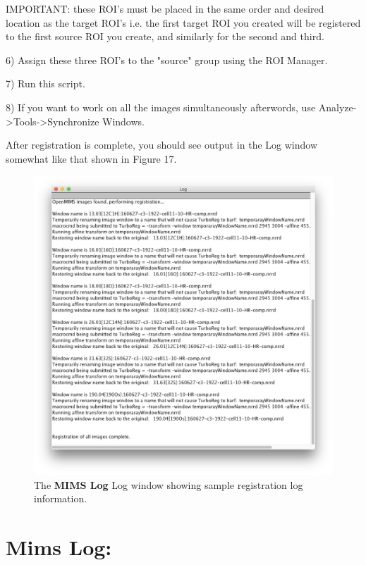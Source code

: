 \documentclass{article}
\begin{document}
IMPORTANT: these ROI's must be placed in the same order and desired location as the target ROI's 
i.e. the first target ROI you created will be registered to the first source ROI you create, and similarly for the second and third.

6) Assign these three ROI's to the "source" group using the ROI Manager.

7) Run this script.

8) If you want to work on all the images simultaneously afterwords, use Analyze->Tools->Synchronize Windows.

	After registration is complete, you should see output in the Log window somewhat like that shown in Figure 17.
	
	\begin{figure}[ht]
	\centering
	\includegraphics[scale=0.70]{snapshotRegistrationResults.png}
	\caption{The \textbf{MIMS Log} Log window showing sample registration log information.}
	\end{figure}
	
	
	
	

\newpage
\section*{Mims Log:}
	
\end{document}
